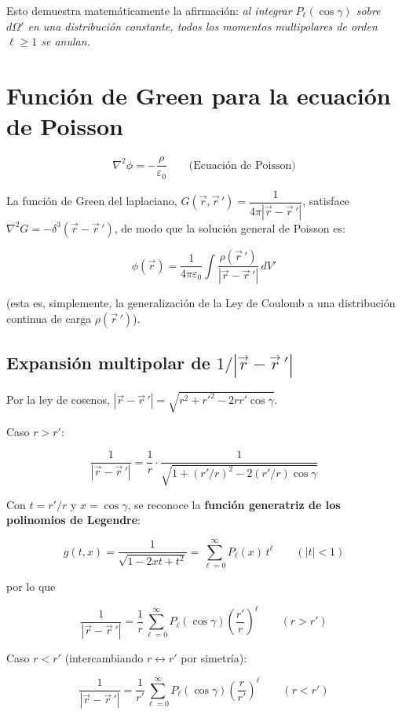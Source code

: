 \documentclass[a4paper]{article}
\begin{document}
Esto demuestra matemáticamente la afirmación: \textit{al integrar $P_\ell(\cos \gamma)$ sobre $d\Omega'$ en una distribución constante, todos los momentos multipolares de orden $\ell \ge 1$ se anulan.}


\medskip


\section{Función de Green para la ecuación de Poisson}


\[
\nabla^2\phi=-\frac{\rho}{\varepsilon_0}\qquad\text{(Ecuación de Poisson)}
\]


La función de Green del laplaciano, $G(\vec r,\vec r\,')=\dfrac{1}{4\pi|\vec r-\vec r\,'|}$, satisface $\nabla^2G=-\delta^{3}(\vec r-\vec r\,')$, de modo que la solución general de Poisson es:

\[
\boxed{\phi(\vec r)=\frac{1}{4\pi\varepsilon_0}\int\frac{\rho(\vec r\,')}{|\vec r-\vec r\,'|}\,dV'}\tag{5}
\]


(esta es, simplemente, la generalización de la Ley de Coulomb a una distribución continua de carga $\rho(\vec r\,')$).

\subsection{\texorpdfstring{Expansión multipolar de $1/|\vec r-\vec r\,'|$}{Expansión multipolar del potencial de Green}}


Por la ley de cosenos, $|\vec r-\vec r\,'|=\sqrt{r^2+r'^2-2rr'\cos\gamma}$.

Caso $r>r'$:

\[
\frac{1}{|\vec r-\vec r\,'|}=\frac{1}{r}\cdot\frac{1}{\sqrt{1+(r'/r)^2-2(r'/r)\cos\gamma}}
\]


Con $t=r'/r$ y $x=\cos\gamma$, se reconoce la \textbf{función generatriz de los polinomios de Legendre}:

\[
g(t,x)=\frac{1}{\sqrt{1-2xt+t^2}}=\sum_{\ell=0}^{\infty}P_\ell(x)\,t^{\ell}\qquad(|t|<1)
\]


por lo que

\[
\frac{1}{|\vec r-\vec r\,'|}=\frac{1}{r}\sum_{\ell=0}^{\infty}P_\ell(\cos\gamma)\left(\frac{r'}{r}\right)^{\ell}\qquad(r>r')
\]


Caso $r<r'$ (intercambiando $r\leftrightarrow r'$ por simetría):

\[
\frac{1}{|\vec r-\vec r\,'|}=\frac{1}{r'}\sum_{\ell=0}^{\infty}P_\ell(\cos\gamma)\left(\frac{r}{r'}\right)^{\ell}\qquad(r<r')
\]
\end{document}
